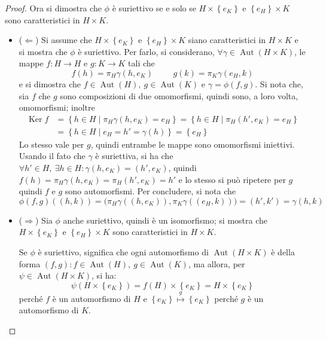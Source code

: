 \documentclass[11pt]{article}
\theoremstyle{style}
\numberwithin{equation}{subsection}
\begin{document}
\begin{proof}
Ora si dimostra che $\phi $ \`e suriettivo se e solo se $H \times \left\{ e_K \right\} $ e $\left\{ e_H \right\} \times K$ sono caratteristici in $H\times K$.
\begin{itemize}
	\item ($\Leftarrow $) Si assume che $H \times \left\{ e_K \right\} $ e $\left\{ e_H \right\} \times K$ siano caratteristici in $H \times K$ e si mostra che $\phi $ \`e suriettivo.
		Per farlo, si considerano, $\forall \gamma \in  \operatorname{Aut} (H \times K)$, le mappe $f: H \to H$ e $g : K \to K $ tali che
		\[
		f(h) = \pi_H \gamma(h,e_K) \hspace{1cm} g(k) = \pi_K \gamma(e_H,k)
		\] 
		e si dimostra che $f \in \operatorname{Aut} (H), \ g\in \operatorname{Aut} (K)$ e $\gamma = \phi (f,g)$.
		Si nota che, sia $f$ che $g$ sono composizioni di due omomorfismi, quindi sono, a loro volta, omomorfismi; inoltre
		\[
		\begin{split}
				\operatorname{Ker} f &= \left\{ h \in H  \mid \pi _H \gamma(h,e_K) = e_H \right\} = \left\{ h \in H  \mid \pi_H ( h', e_K) = e_H \right\} \\
						     &= \left\{ h \in H  \mid e_H = h'= \gamma(h) \right\} = \left\{ e_H \right\} 
		\end{split}
		\] 
	Lo stesso vale per $g$, quindi entrambe le mappe sono omomorfismi iniettivi.
	Usando il fato che $\gamma$ \`e suriettiva, si ha che $\forall h' \in  H , \ \exists h \in H : \gamma(h,e_K) = (h',e_K)$, quindi $f(h) = \pi_H \gamma(h,e_K) = \pi_H(h',e_K) = h'$ e lo stesso si pu\`o ripetere per $g$ quindi $f$ e $g$ sono automorfismi.
	Per concludere, si nota che
	\[
	\phi (f,g)((h,k)) = \big(\pi_H \gamma((h,e_K)),\pi_K \gamma((e_H,k))\big) = (h',k') = \gamma(h,k)
	\] 
\item ($\Rightarrow $) Sia $\phi $ anche suriettivo, quindi \`e un isomorfismo; si mostra che $H \times \left\{ e_K \right\} $ e $\left\{ e_ H\right\}  \times  K$ sono caratteristici in $H \times K$.

	Se $\phi  $ \`e suriettivo, significa che ogni automorfismo di $\operatorname{Aut} (H \times K) $ \`e della forma $(f,g) : f \in \operatorname{Aut} (H) , \ g \in \operatorname{Aut} (K)$, ma allora, per $\psi  \in  \operatorname{Aut}(H \times K )$, si ha:
	\[
	\psi (H \times \left\{ e_K \right\} ) = f(H) \times \left\{ e_K \right\} = H \times \left\{ e_K \right\} 
	\] 
	perch\'e $f$ \`e un automorfismo di $H$ e $\left\{ e_K \right\} \stackrel{g}{\longmapsto} \left\{ e_K \right\} $ perch\'e $g$ \`e un automorfismo di $K$.
\end{itemize}
	\end{proof}
\end{document}
